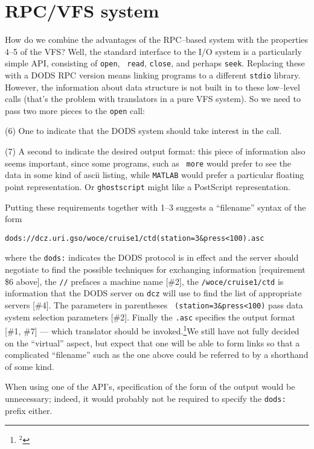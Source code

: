 \section{RPC/VFS system}

How do we combine the advantages of the RPC--based system with the
properties 4--5 of the VFS? Well, the standard interface to the I/O
system is a particularly simple API, consisting of {\tt open}, {\tt
read}, {\tt close}, and perhaps {\tt seek}. Replacing these with a
DODS RPC version means linking programs to a different {\tt stdio}
library. However, the information about data structure is not built in
to these low--level calls (that's the problem with translators in a
pure VFS system). So we need to pass two more pieces to the {\tt open}
call: 
\item{(6)} One to indicate that the DODS system should take interest in the
call.
\item{(7)} A second to indicate the desired output format: this piece
of information also seems important, since some programs, such as {\tt
more} would prefer to see the data in some kind of ascii listing,
while {\tt MATLAB} would prefer a particular floating point
representation. Or {\tt ghostscript} might like a PostScript
representation.

\ni Putting these requirements together with 1--3 suggests a
``filename'' syntax of the form 

\smallskip
{\tt dods://dcz.uri.gso/woce/cruise1/ctd(station=3\&press<100).asc}
\smallskip

\ni where the {\tt dods:} indicates the DODS protocol is in effect and
the server should negotiate to find the possible techniques for
exchanging information [requirement \$6 above], the {\tt //} prefaces
a machine name [\#2], the {\tt /woce/cruise1/ctd} is information that
the DODS server on {\tt dcz} will use to find the list of appropriate
servers [\#4]. The parameters in parentheses {\tt
(station=3\&press<100)} pass data system selection parameters [\#2].
Finally the {\tt .asc} specifies the output format [\#1, \#7] ---
which translator should be invoked.\footnote{${}^2$}{We still have not
fully decided on the ``virtual'' aspect, but expect that one will be
able to form links so that a complicated ``filename'' such as the one
above could be referred to by a shorthand of some kind.} 

When using one of the API's, specification of the form of the output
would be unnecessary; indeed, it would probably not be required to
specify the {\tt dods:} prefix either.


